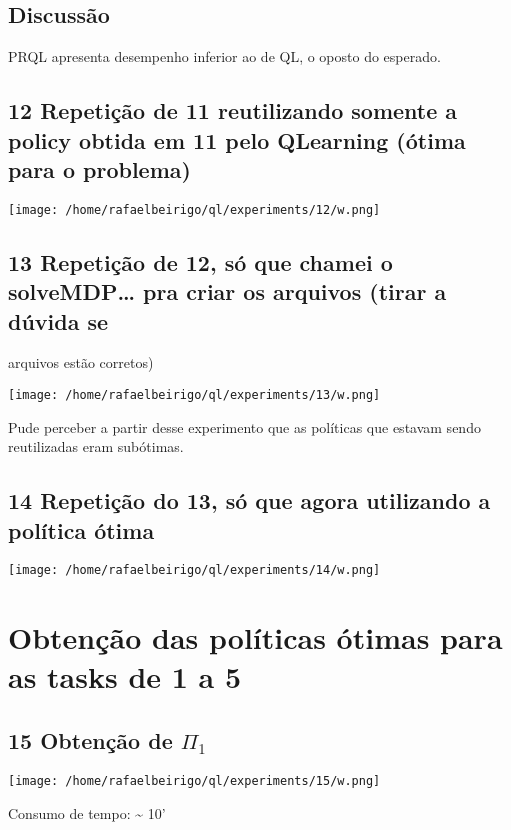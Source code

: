 \documentclass[11pt]{article}
\begin{document}
\subsection{Discussão}
\label{sec-4.1}

PRQL apresenta desempenho inferior ao de QL, o oposto do esperado.


\subsection{12 Repetição de 11 reutilizando somente a policy obtida em 11 pelo QLearning (ótima para o problema)}
\label{sec-4.2}

\centerline{\texttt{[image: /home/rafaelbeirigo/ql/experiments/12/w.png]}}




\subsection{13 Repetição de 12, só que chamei o solveMDP\ldots{} pra criar os arquivos (tirar a dúvida se}
\label{sec-4.3}

  arquivos estão corretos)
\centerline{\texttt{[image: /home/rafaelbeirigo/ql/experiments/13/w.png]}}

Pude perceber a partir desse experimento que as políticas que estavam
sendo reutilizadas eram subótimas.


\subsection{14 Repetição do 13, só que agora utilizando a política ótima}
\label{sec-4.4}

\centerline{\texttt{[image: /home/rafaelbeirigo/ql/experiments/14/w.png]}}



\section{Obtenção das políticas ótimas para as tasks de 1 a 5}
\label{sec-5}

\subsection{15 Obtenção de $\Pi$$_1$}
\label{sec-5.1}

\centerline{\texttt{[image: /home/rafaelbeirigo/ql/experiments/15/w.png]}}

  Consumo de tempo: \~{} 10'
\end{document}
